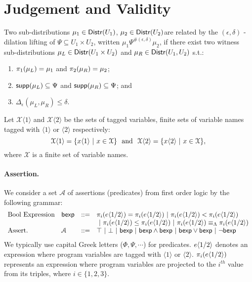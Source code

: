 \documentclass[a4paper,11pt]{article}
\begin{document}
\section{Judgement and Validity}
%
\begin{defn}
Two sub-distributions $\mu_1 \in \mathsf{Distr}(U_1)$, $\mu_2 \in \mathsf{Distr}(U_2)$are related by the $(\epsilon, \delta)$ - dilation lifting of $\Psi \subseteq U_1 \times U_2$, written $\mu_1 \Psi^{\#(\epsilon, \delta)} \mu_2$, if there exist two witness sub-distributions $\mu_L \in \mathsf{Distr}(U_1 \times U_2)$ and $\mu_R \in \mathsf{Distr}(U_1, U_2)$ s.t.:
\begin{enumerate}
	\item $\pi_1(\mu_L) = \mu_1$ and $\pi_2(\mu_R) = \mu_2$;
	\item $\mathsf{supp}(\mu_L) \subseteq \Psi$ and $\mathsf{supp}(\mu_R) \subseteq \Psi$; and
	\item $\Delta_{\epsilon}(\mu_L, \mu_R) \leq \delta$.
\end{enumerate}
\end{defn}
%
\begin{defn}
Let $\mathcal{X}\langle 1 \rangle$ and $\mathcal{X}\langle 2 \rangle$ be the sets of tagged variables, finite sets of variable names tagged with $\langle 1 \rangle$ or $\langle 2 \rangle$ respectively:
\[
	\mathcal{X}\langle 1 \rangle = \{x\langle 1 \rangle ~|~ x \in \mathcal{X}\}
	~~
	\text{and}
	~~
	\mathcal{X}\langle 2 \rangle = \{x\langle 2 \rangle ~|~ x \in \mathcal{X}\},
\]
where $\mathcal{X}$ is a finite set of variable names.
\end{defn}
%
\paragraph{Assertion.} We consider a set $\mathcal{A}$ of assertions (predicates) from first order logic by the following grammar:
\[
\begin{array}{llll}
%
\mbox{Bool Expression} & \bexp & :: = & 
\pi_i(\expr\langle 1 / 2 \rangle) = \pi_i(\expr\langle 1 / 2 \rangle)  
 ~|~ \pi_i(\expr\langle 1 / 2 \rangle) < \pi_i(\expr\langle 1 / 2 \rangle) \\
 & & &
 ~|~ \pi_i(\expr\langle 1 / 2 \rangle) \leq \pi_i(\expr\langle 1 / 2 \rangle)
 ~|~ \pi_i(\expr\langle 1 / 2 \rangle) \lameq \pi_i(\expr\langle 1 / 2 \rangle)
	\\
%
\mbox{Assert.} & \mathcal{A} & ::= & \top ~|~ \bot ~|~ \bexp 
	~|~ \bexp \land \bexp ~|~ \bexp \lor \bexp ~|~ \neg \bexp
\end{array}
\]
%
We typically use capital Greek letters ($\Phi, \Psi, \cdots$) for predicates. 
%
$e\langle 1 / 2 \rangle$ denotes an expression where program variables are tagged with $\langle 1 \rangle$ or $\langle 2 \rangle$.
%
$\pi_i(e\langle 1 / 2 \rangle)$ represents an expression where program variables are projected to the $i^{th}$ value from its triples, where $i \in \{1, 2, 3\}$.
%
\end{document}
